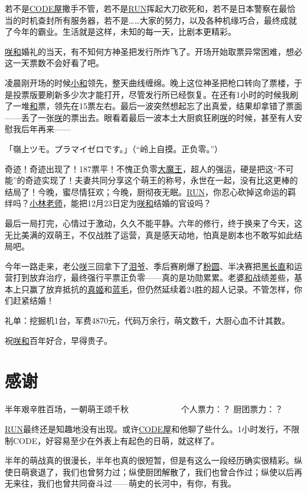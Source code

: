 若不是\uline{CODE屋}撒手不管，若不是\uline{RUN}挥起大刀砍死和，若不是日本警察在最恰当的时机查封所有服务器，若不是……大家的努力，以及各种机缘巧合，最终成就了今年的霸业。生活就是这样，未知的每一天，比剧本更精彩。

\uline{咲}\uline{和}婚礼的当天，有不知何方神圣把发行所炸飞了。开场开始取票异常困难，想必这一天票数不会好看了吧。

凌晨刚开场的时候\uline{小和}领先，整天曲线缠绵。晚上这位神圣把枪口转向了票楼，于是投票版要刷新多少次才能打开，尽管发行所已经恢复。在还有1小时的时候我刷了一堆\uline{和}票，领先在15票左右。最后一波突然想起忘了出真爱，结果却拿错了票面——丢了一张\uline{咲}的票出去。眼看着最后一波本土大厨疯狂刷\uline{咲}的时候，甚至有人安慰我后年再来——

{\mincho 「嶺上ツモ。プラマイゼロです。」}（“岭上自摸。正负零。”）

奇迹！奇迹出现了！187票平！不愧正负零\uline{大魔王}，超人的强运，硬是把这“不可能”的奇迹实现了！夫妻共同分享这个萌王的称号，永世在一起，没有比这更棒的结局了！今晚，蜜尽情狂欢；今晚，厨彻夜无眠。\uline{RUN}，你忍心砍掉这命运的羁绊吗？\uline{小林老师}，能把12月23日定为\uline{咲}\uline{和}结婚的官设吗？

最后一局打完，心情过于激动，久久不能平静。六年的修行，终于换来了今天，这无比美满的双萌王，不仅战胜了运营，真是感天动地，怕真是剧本也不敢写如此结局吧。

今年一路走来，老公\uline{咲}三回拿下了\uline{泪爷}、季后赛刷爆了\uline{粉圆}、半决赛把\uline{黑长直}和运营打到放弃治疗，最终强行平票正负零——真的是功勋累累。老婆\uline{和}战绩差些，基本上只赢了放弃抵抗的\uline{真姬}和\uline{蓝毛}，但仍然延续着24胜的超人记录。不管怎样，你们赶紧结婚！

礼单：挖掘机1台，军费4870元，代码万余行，萌文数千，大厨心血不计其数。

祝\uline{咲}\uline{和}百年好合，早得贵子。

\chapter{感谢}
\begin{center}
{\subTitle 半年艰辛胜百场，一朝萌王颂千秋}
\subMemo
　　　　　　个人票力：？ 厨团票力：？
\end{center}

\uline{RUN}最终还是知趣地没有出现。或许\uline{CODE屋}和他聊了些什么。1小时发行，不限制CODE，好容易至少在外表上有起色的日萌，就这样了。

半年的萌战真的很漫长，半年也真的很短暂，但是有这么一段经历确实很精彩。纵使日萌衰退了，我们也曾努力过；纵使厨团解散了，我们也曾合作过；纵使以后再无来往，我们也曾共同奋斗过——萌史的长河中，有你，有我。

